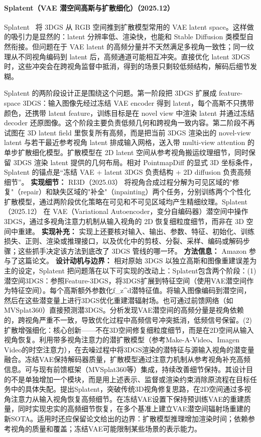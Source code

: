 \paragraph{Splatent（VAE 潜空间高斯与扩散细化）（2025.12）}
Splatent~\cite{2512_09923} 将 3DGS 从 RGB 空间推到扩散模型常用的 VAE latent space。这样做的吸引力是显然的：latent 分辨率低、渲染快，也能和 Stable Diffusion 类模型自然衔接。但问题在于 VAE latent 的高频分量并不天然满足多视角一致性；同一纹理从不同视角编码到 latent 后，高频通道可能相互冲突。直接优化 latent 3DGS 时，这些冲突会在跨视角监督中抵消，得到的场景只剩较低频结构，解码后细节发糊。

Splatent 的两阶段设计正是围绕这个问题。第一阶段把 3DGS 扩展成 feature-space 3DGS：输入图像先经过冻结 VAE encoder 得到 latent，每个高斯不只携带颜色，还携带 latent feature，训练目标是在 novel view 中渲染 latent 并通过冻结 decoder 还原图像。这个阶段主要负责低频几何和跨视角一致内容。第二阶段不再试图在 3D latent field 里恢复所有高频，而是把当前 3DGS 渲染出的 novel-view latent 与若干最近参考视角 latent 排成输入网格，送入带 multi-view attention 的单步扩散细化模型。扩散模型在 2D latent 空间从参考视角搬运纹理细节，同时保留 3DGS 渲染 latent 提供的几何布局。相对 PointmapDiff 的显式 3D 坐标条件，Splatent 的锚点是“冻结 VAE + latent 3DGS 负责结构 + 2D diffusion 负责高频细节”。
\textbf{实现细节：} RI3D（2025.03） 将视角合成过程分解为可见区域的"修复"（repair）和缺失区域的"补全"（inpainting）两个任务，分别训练两个个性化扩散模型，通过两阶段优化策略在可见和不可见区域均产生精细纹理。Splatent（2025.12） 在 VAE（Variational Autoencoder，变分自编码器）潜空间中操作 3DGS，通过多视角注意力机制从输入视角的 2D 恢复细粒度细节，而非在 3D 空间中重建。
\textbf{实现补充：} 实现上还要核对输入、输出、参数、特征、初始化、训练损失、正则、渲染或推理接口，以及优化中的剪枝、分裂、采样、编码或解码步骤；这些抓手决定该方法到底改了 3DGS 管线的哪一环。
\textbf{方法信息：} Amazon 参与了这篇论文。
\textbf{设计动机与边界：} 相对原始 3DGS 以独立高斯和图像重建误差为主的设定，Splatent 把问题落在以下可实现的改动上：Splatent包含两个阶段：(1) 潜空间3DGS：参照Feature-3DGS，将3DGS扩展到特征空间（使用VAE潜空间作为特征空间）。每个高斯额外参数化f\_z\^{}d潜特征值。将输入图像编码到潜空间，然后在这些潜变量上进行3DGS优化重建潜辐射场。也可通过前馈网络（如MVSplat360）直接预测潜3DGS。分析发现VAE潜空间的高频分量是视角依赖的，跨视角严重不一致，导致优化过程中高频信号冲突抵消，低频信号保留。(2) 扩散增强细化：核心创新——不在3D空间修复细粒度细节，而是在2D空间从输入视角恢复。利用带多视角注意力的潜扩散模型（参考Make-A-Video、Imagen Video的时空注意力），在去噪过程中将3DGS渲染的潜特征与源输入视角的潜变量融合。冻结VAE保持解码器质量，扩散模型通过注意力机制从参考视角补充高频信息。可与现有前馈框架（MVSplat360等）集成，持续改善细节保持。其设计目的不是单独增加一个模块，而是用上述表示、监督或渲染约束消除原流程在目标任务中的具体失配。提出Splatent，突破传统3D视角修复思路，在2D空间通过多视角注意力从输入视角恢复高频细节。在冻结VAE设置下保持预训练VAE的重建质量，同时实现忠实的高频细节恢复，在多个基准上建立VAE潜空间辐射场重建的新SOTA。适用时还应保留论文给出的边界：扩散模型推理增加渲染时间；依赖参考视角的质量和覆盖；冻结VAE可能限制某些场景的表示能力。
